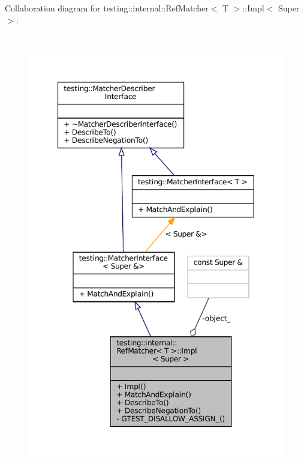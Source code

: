 Collaboration diagram for testing\+:\+:internal\+:\+:Ref\+Matcher$<$ T $>$\+:\+:Impl$<$ Super $>$\+:
\nopagebreak
\begin{figure}[H]
\begin{center}
\leavevmode
\includegraphics[height=550pt]{classtesting_1_1internal_1_1RefMatcher_3_01T_01_6_01_4_1_1Impl__coll__graph}
\end{center}
\end{figure}

